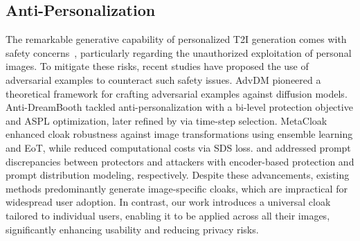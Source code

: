  

\subsection{Anti-Personalization}
The remarkable generative capability of personalized T2I generation comes with safety concerns~\cite{carlini2023extracting, vyas2023provable}, particularly regarding the unauthorized exploitation of personal images. 
To mitigate these risks, recent studies have proposed the use of adversarial examples to counteract such safety issues. 
AdvDM \cite{liang2023adversarial} pioneered a theoretical framework for crafting adversarial examples against diffusion models. 
Anti-DreamBooth \cite{van2023anti} tackled anti-personalization with a bi-level protection objective and ASPL optimization, later refined by \citet{wang2024simac} via time-step selection. 
MetaCloak \cite{liu2024metacloak} enhanced cloak robustness against image transformations using ensemble learning and EoT, while \citet{xue2023toward} reduced computational costs via SDS loss. 
\citet{li2024pid} and \citet{wan2024prompt} addressed prompt discrepancies between protectors and attackers with encoder-based protection and prompt distribution modeling, respectively.
Despite these advancements, existing methods predominantly generate image-specific cloaks, which are impractical for widespread user adoption. 
In contrast, our work introduces a universal cloak tailored to individual users, enabling it to be applied across all their images, significantly enhancing usability and reducing privacy risks.
